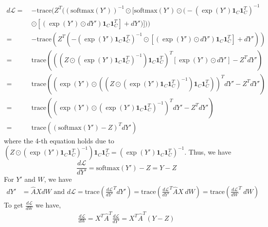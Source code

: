 \documentclass{article}
\newcommand{\trace}{\mathrm{trace}}
\newcommand{\0}{{\boldsymbol{0}}}
\newcommand{\6}{{\partial}}
\newcommand{\8}{{\infty}}
\newcommand{\4}{{\nabla}}
\begin{document}
\begin{equation}
\begin{aligned}
d \mathcal{L} =\ & -\trace\Bigg(Z^T \bigg((\text{softmax} (Y'))^{-1} \odot \bigg[ \text{softmax} (Y') \odot \bigg(  - \left(\exp(Y') \bm{1}_C \bm{1}_C^T \right)^{-1} \\
& \odot \left[(\exp(Y') \odot d Y') \bm{1}_C \bm{1}_C^T \right] + d Y' \bigg) \bigg] \bigg) \Bigg)\\ \nonumber
=\ & -\trace\left(Z^T \left(  - \left(\exp(Y') \bm{1}_C \bm{1}_C^T \right)^{-1} \odot \left[(\exp(Y') \odot d Y') \bm{1}_C \bm{1}_C^T \right] + d Y' \right) \right) \\ \nonumber
 =\ & \trace\left( \left( \left(Z \odot \left(\exp(Y') \bm{1}_C \bm{1}_C^T \right)^{-1} \right) \bm{1}_C \bm{1}_C^T \right)^T  \left[\exp(Y') \odot d Y'  \right] - Z^T d Y' \right)\\ \nonumber
=\ &  \trace\left( \left(  \exp(Y') \odot \left( \left(Z \odot \left(\exp(Y') \bm{1}_C \bm{1}_C^T \right)^{-1} \right) \bm{1}_C \bm{1}_C^T \right) \right)^T  d Y' - Z^T d Y' \right)\\ \nonumber
=\ &  \trace\left( \left(  \exp(Y') \odot \left(\exp(Y') \bm{1}_C \bm{1}_C^T \right)^{-1} \right)^T   d Y' - Z^T d Y' \right)\\ \nonumber
=\ & \trace\left( (\text{softmax}(Y') - Z)^T dY' \right)  \nonumber
\end{aligned}
\end{equation}
where the  4-th equation holds due to $\left(Z \odot \left(\exp(Y') \bm{1}_C \bm{1}_C^T \right)^{-1} \right) \bm{1}_C \bm{1}_C^T = \left(\exp(Y') \bm{1}_C \bm{1}_C^T \right)^{-1}$. Thus, we have
\begin{equation*}
    \frac{d \mathcal{L} }{d Y'} = \text{softmax}(Y') - Z = Y-Z
\end{equation*}
For $Y'$ and $W$, we have
\begin{align*}
   d Y' & = \hat{A} X d W \text{  and  } d\mathcal{L}= \text{trace}\left(\frac{d \mathcal{L} }{d Y'}^T d Y' \right) = \text{trace}\left(\frac{d \mathcal{L} }{d Y'}^T \hat{A}  X \ d W \right) = \text{trace}\left(\frac{d \mathcal{L} }{d W}^T \ d W \right) 
\end{align*}
To get $\frac{d \mathcal{L} }{d W}$ we have, 
\begin{equation}\label{eq5}
\begin{aligned}
   \frac{d \mathcal{L}}{d W} = X^T \hat{A}^T \frac{d \mathcal{L} }{ d Y'} = X^T \hat{A}^T (Y-Z)
\end{aligned}
\end{equation}
\end{document}
